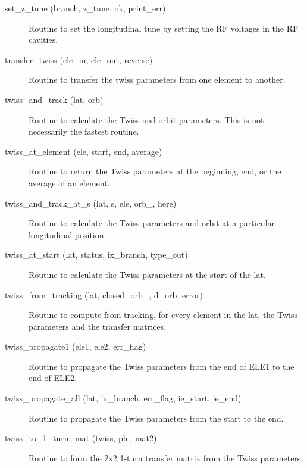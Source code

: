 \begin{description}
\label{r:set.z.tune}
\item[set_z_tune (branch, z_tune, ok, print_err)] \Newline
Routine to set the longitudinal tune by setting the RF voltages in the RF cavities. 

\label{r:transfer.twiss}
\item[transfer_twiss (ele_in, ele_out, reverse)] \Newline 
Routine to transfer the twiss parameters from one element to another.

\item[twiss_and_track (lat, orb)] \Newline
Routine to calculate the Twiss and orbit parameters. 
This is not necessarily the fastest routine. 

\label{r:twiss.at.element}
\item[twiss_at_element (ele, start, end, average)] \Newline
Routine to return the Twiss parameters at the beginning, end, or the average of an element. 

\item[twiss_and_track_at_s (lat, s, ele, orb_, here)] \Newline
Routine to calculate the Twiss parameters and orbit at a particular longitudinal position. 

\label{r:twiss.at.start}
\item[twiss_at_start (lat, status, ix_branch, type_out)] \Newline
Routine to calculate the Twiss parameters at the start of the lat. 

\label{r:twiss.from.tracking}
\item[twiss_from_tracking (lat, closed_orb_, d_orb, error)] \Newline
Routine to compute from tracking, for every element in the lat, 
the Twiss parameters and the transfer matrices. 

\label{r:twiss.propagate1}
\item[twiss_propagate1 (ele1, ele2, err_flag)] \Newline
Routine to propagate the Twiss parameters from the end of ELE1 to the end of ELE2. 

\label{r:twiss.propagate.all}
\item[twiss_propagate_all (lat, ix_branch, err_flag, ie_start, ie_end)] \Newline
Routine to propagate the Twiss parameters from the start to the end. 

\label{r:twiss.to.1.turn.mat}
\item[twiss_to_1_turn_mat (twiss, phi, mat2)] \Newline
Routine to form the 2x2 1-turn transfer matrix from the Twiss parameters. 

\end{description}

